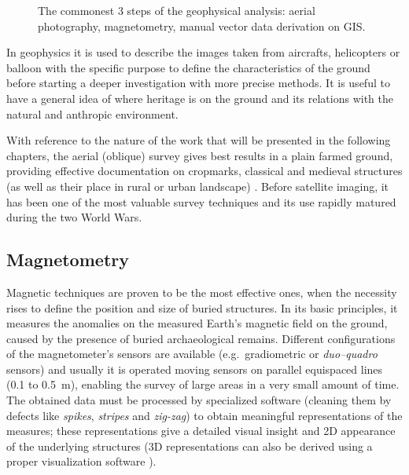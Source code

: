             \begin{wrapfigure}{l}{0.4\textwidth}
                \centering
                \vspace{-0.02\textheight}
                
                \caption[The commontest 3 steps of the geophysical analysis]{The commonest 3 steps of the geophysical analysis: aerial photography, magnetometry, manual vector data derivation on GIS.}
                \label{fig:magn-circles}
                \vspace{-0.14\textheight}
            \end{wrapfigure}

            In geophysics it is used to describe the images taken from aircrafts, helicopters or balloon with the specific purpose to define the characteristics of the ground before starting a deeper investigation with more precise methods.
            It is useful to have a general idea of where heritage is on the ground and its relations with the natural and anthropic environment.

            With reference to the nature of the work that will be presented in the following chapters, the aerial (oblique) survey gives best results in a plain farmed ground, providing effective documentation on cropmarks, classical and medieval structures (as well as their place in rural or urban landscape) \cite[pp.~11--12]{arch-site-detection}. Before satellite imaging, it has been one of the most valuable survey techniques and its use rapidly matured during the two World Wars.
            
        \subsection{Magnetometry}
            Magnetic techniques are proven to be the most effective ones, when the necessity rises to define the position and size of buried structures. In its basic principles, it measures the anomalies on the measured Earth's magnetic field on the ground, caused by the presence of buried archaeological remains. Different configurations of the magnetometer's sensors are available (e.g.\ gradiometric or \emph{duo--quadro} sensors) and usually it is operated moving sensors on parallel equispaced lines (\num{0.1} to \SI{0.5}{\meter}), enabling the survey of large areas in a very small amount of time. The obtained data must be processed by specialized software (cleaning them by defects like \emph{spikes}, \emph{stripes} and \emph{zig-zag}) to obtain meaningful representations of the measures; these representations give a detailed visual insight and 2D appearance of the underlying structures (3D representations can also be derived using a proper visualization software \cite{terrestrial-remote}).

